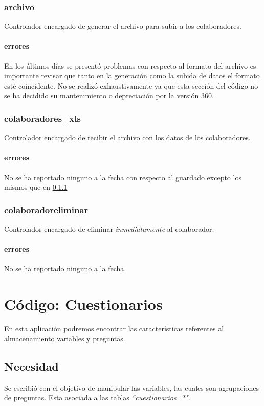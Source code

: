 \documentclass[10pt,a4paper]{book}
\begin{document}
	\subsection{archivo}
	Controlador encargado de generar el archivo para subir a los colaboradores.
	\subsubsection{errores}\label{e_archivo}
	En los últimos días se presentó problemas con respecto al formato del archivo es importante revisar que tanto en la generación como la subida de datos el formato esté coincidente. No se realizó exhaustivamente ya que esta sección del código no se ha decidido su mantenimiento o depreciación por la versión 360.

	\subsection{colaboradores\_xls}
	Controlador encargado de recibir el archivo con los datos de los colaboradores.
	\subsubsection{errores}
	No se ha reportado ninguno a la fecha con respecto al guardado excepto los mismos que en \ref{e_archivo}

	\subsection{colaboradoreliminar}
	Controlador encargado de eliminar \textit{inmediatamente} al colaborador.
	\subsubsection{errores}
	No se ha reportado ninguno a la fecha.


	\chapter{Código: Cuestionarios}

	En esta aplicación podremos encontrar las características referentes al almacenamiento variables y preguntas.

	\section{Necesidad}

	Se escribió con el objetivo de manipular las variables, las cuales son agrupaciones de preguntas. Esta asociada a las tablas  \textit{``cuestionarios\_*"}.
\end{document}
